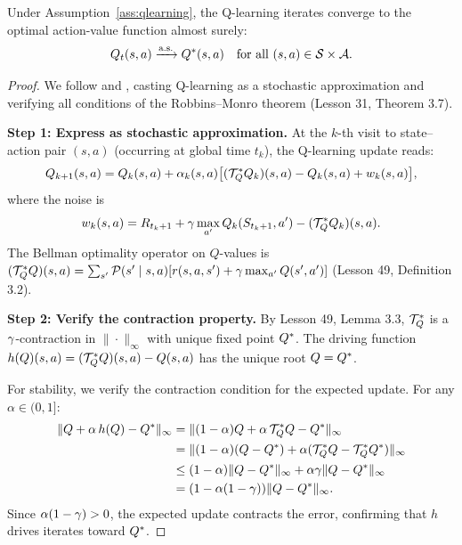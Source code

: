 \documentclass[11pt,a4paper]{article}
\begin{document}
\begin{keyresult}[title={Convergence of Q-Learning (Watkins \& Dayan 1992)}]
\begin{theorem}
\label{thm:qlearning}
Under Assumption~\ref{ass:qlearning}, the Q-learning iterates
converge to the optimal action-value function almost surely:
\begin{equation}
  Q_t(s,a) \xrightarrow{\text{a.s.}} Q^*(s,a)
  \quad \text{for all } (s,a) \in \mathcal{S} \times \mathcal{A}.
  \label{eq:qlearning_convergence}
\end{equation}
\end{theorem}
\end{keyresult}

\begin{proof}
We follow \citet{watkins1992} and \citet{tsitsiklis1994}, casting
Q-learning as a stochastic approximation and verifying all conditions
of the Robbins--Monro theorem (Lesson 31, Theorem 3.7).

\textbf{Step 1: Express as stochastic approximation.}
At the $k$-th visit to state--action pair $(s,a)$ (occurring at
global time $t_k$), the Q-learning update reads:
\begin{equation}
  Q_{k+1}(s,a) = Q_k(s,a)
  + \alpha_k(s,a)\bigl[(\mathcal{T}^*_Q Q_k)(s,a) - Q_k(s,a)
  + w_k(s,a)\bigr],
  \label{eq:ql_sa}
\end{equation}
where the noise is
\begin{equation}
  w_k(s,a) = R_{t_k+1} + \gamma \max_{a'} Q_k(S_{t_k+1}, a')
  - (\mathcal{T}^*_Q Q_k)(s,a).
  \label{eq:ql_noise}
\end{equation}
The Bellman optimality operator on $Q$-values is
$(\mathcal{T}^*_Q Q)(s,a) = \sum_{s'} \mathcal{P}(s' \mid s,a)
[r(s,a,s') + \gamma \max_{a'} Q(s',a')]$
(Lesson 49, Definition 3.2).

\textbf{Step 2: Verify the contraction property.}
By Lesson 49, Lemma 3.3, $\mathcal{T}^*_Q$ is a
$\gamma$-contraction in $\|\cdot\|_\infty$ with unique fixed
point $Q^*$. The driving function
$h(Q)(s,a) = (\mathcal{T}^*_Q Q)(s,a) - Q(s,a)$ has the unique root
$Q = Q^*$.

For stability, we verify the contraction condition for the expected
update. For any $\alpha \in (0,1]$:
\begin{align}
  \|Q + \alpha\,h(Q) - Q^*\|_\infty
  &= \|(1-\alpha)Q + \alpha\,\mathcal{T}^*_Q Q - Q^*\|_\infty
    \nonumber\\
  &= \|(1-\alpha)(Q - Q^*) + \alpha(\mathcal{T}^*_Q Q
    - \mathcal{T}^*_Q Q^*)\|_\infty \nonumber\\
  &\leq (1-\alpha)\|Q - Q^*\|_\infty
    + \alpha\gamma\|Q - Q^*\|_\infty \nonumber\\
  &= (1 - \alpha(1-\gamma))\|Q - Q^*\|_\infty.
  \label{eq:ql_stability}
\end{align}
Since $\alpha(1-\gamma) > 0$, the expected update contracts the
error, confirming that $h$ drives iterates toward $Q^*$.


\end{proof}
\end{document}
